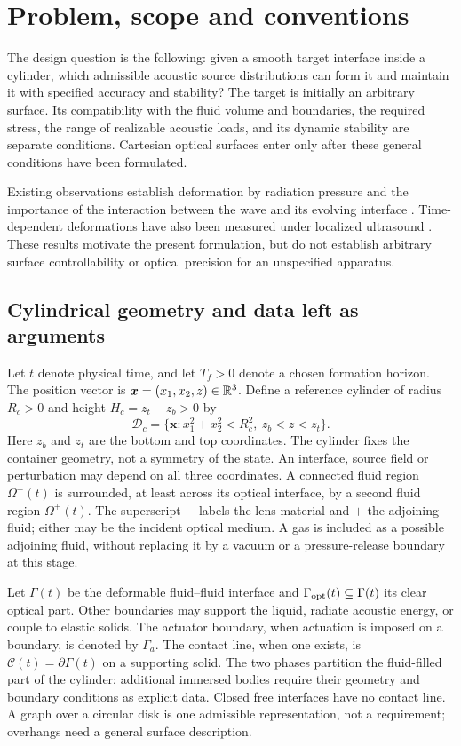 \section{Problem, scope and conventions}\label{sec:scope}

The design question is the following: given a smooth target interface inside a
cylinder, which admissible acoustic source distributions can form it and
maintain it with specified accuracy and stability? The target is initially an
arbitrary surface. Its compatibility with the fluid volume and boundaries,
the required stress, the range of realizable acoustic loads, and its dynamic
stability are separate conditions. Cartesian optical surfaces enter only after
these general conditions have been formulated.

Existing observations establish deformation by radiation pressure and the
importance of the interaction between the wave and its evolving interface
\cite{bertin2012,chesneau2022}. Time-dependent deformations have also been
measured under localized ultrasound \cite{sisombat2023}. These results motivate
the present formulation, but do not establish arbitrary surface controllability
or optical precision for an unspecified apparatus.

\subsection{Cylindrical geometry and data left as arguments}
Let $t$ denote physical time, and let $T_f>0$ denote a chosen formation horizon.
The position vector is $\bm x=(x_1,x_2,z)\in\mathbb R^3$. Define a reference cylinder
of radius $R_c>0$ and height $H_c=z_t-z_b>0$ by
\begin{equation}
 \mathcal D_c=\{\bm x:x_1^2+x_2^2<R_c^2,\ z_b<z<z_t\}.
 \label{eq:cylinder}
\end{equation}
Here $z_b$ and $z_t$ are the bottom and top coordinates. The cylinder fixes
the container geometry, not a symmetry of the state. An interface, source
field or perturbation may depend on all three coordinates. A connected fluid region
$\Omega^-(t)$ is surrounded, at least across its optical interface, by a second
fluid region $\Omega^+(t)$. The superscript $-$ labels the lens material and $+$
the adjoining fluid; either may be the incident optical medium. A gas is
included as a possible adjoining fluid, without replacing it by a vacuum or a
pressure-release boundary at this stage.

Let $\Gamma(t)$ be the deformable fluid--fluid interface and
$\Gamma_{\rm opt}(t)\subseteq\Gamma(t)$ its clear optical part. Other boundaries
may support the liquid, radiate acoustic energy, or couple to elastic solids.
The actuator boundary, when actuation is imposed on a boundary, is denoted by
$\Gamma_a$. The contact line, when one exists, is
$\mathcal C(t)=\partial\Gamma(t)$ on a supporting solid. The two phases
partition the fluid-filled part of the cylinder; additional immersed bodies
require their geometry and boundary conditions as explicit data. Closed free
interfaces have no contact line. A graph over a circular disk is one admissible
representation, not a requirement; overhangs need a general surface description.

